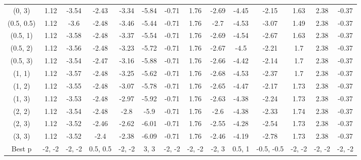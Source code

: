 \documentclass[11pt,a4paper,twoside,openany]{book}\usepackage{knitr}
\begin{document}
{{\begin{knitrout}
\begin{landscape}
\begin{longtable}[t]{cccccccccccccc}
\addlinespace
(0, 3) & 1.12 & -3.54 & -2.43 & -3.34 & -5.84 & -0.71 & 1.76 & -2.69 & -4.45 & -2.15 & 1.63 & 2.38 & -0.37\\
(0.5, 0.5) & 1.12 & -3.6 & -2.48 & -3.46 & -5.44 & -0.71 & 1.76 & -2.7 & -4.53 & -3.07 & 1.49 & 2.38 & -0.37\\
(0.5, 1) & 1.12 & -3.58 & -2.48 & -3.37 & -5.54 & -0.71 & 1.76 & -2.69 & -4.54 & -2.67 & 1.63 & 2.38 & -0.37\\
(0.5, 2) & 1.12 & -3.56 & -2.48 & -3.23 & -5.72 & -0.71 & 1.76 & -2.67 & -4.5 & -2.21 & 1.7 & 2.38 & -0.37\\
(0.5, 3) & 1.12 & -3.54 & -2.47 & -3.16 & -5.88 & -0.71 & 1.76 & -2.66 & -4.42 & -2.14 & 1.7 & 2.38 & -0.37\\
\addlinespace
(1, 1) & 1.12 & -3.57 & -2.48 & -3.25 & -5.62 & -0.71 & 1.76 & -2.68 & -4.53 & -2.37 & 1.7 & 2.38 & -0.37\\
(1, 2) & 1.12 & -3.55 & -2.48 & -3.07 & -5.78 & -0.71 & 1.76 & -2.65 & -4.47 & -2.17 & 1.73 & 2.38 & -0.37\\
(1, 3) & 1.12 & -3.53 & -2.48 & -2.97 & -5.92 & -0.71 & 1.76 & -2.63 & -4.38 & -2.24 & 1.73 & 2.38 & -0.37\\
(2, 2) & 1.12 & -3.54 & -2.48 & -2.8 & -5.9 & -0.71 & 1.76 & -2.6 & -4.38 & -2.33 & 1.74 & 2.38 & -0.37\\
(2, 3) & 1.12 & -3.52 & -2.46 & -2.62 & -6.01 & -0.71 & 1.76 & -2.55 & -4.28 & -2.54 & 1.73 & 2.38 & -0.37\\
\addlinespace
(3, 3) & 1.12 & -3.52 & -2.4 & -2.38 & -6.09 & -0.71 & 1.76 & -2.46 & -4.19 & -2.78 & 1.73 & 2.38 & -0.37\\
Best p & -2, -2 & -2, -2 & 0.5, 0.5 & -2, -2 & 3, 3 & -2, -2 & -2, -2 & -2, 3 & 0.5, 1 & -0.5, -0.5 & -2, -2 & -2, -2 & -2, -2\\*
\end{longtable}
\end{landscape}


\end{knitrout}


\begin{table}[!h]


\end{table}}}
\end{document}
